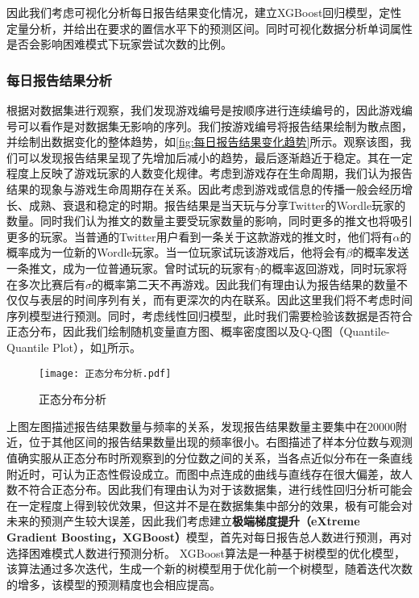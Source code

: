 \documentclass{MathModeling}
\begin{document}
	因此我们考虑可视化分析每日报告结果变化情况，建立XGBoost回归模型，定性定量分析，并给出在要求的置信水平下的预测区间。同时可视化数据分析单词属性是否会影响困难模式下玩家尝试次数的比例。
	\subsubsection{每日报告结果分析}\label{XGBoost}
	根据对数据集进行观察，我们发现游戏编号是按顺序进行连续编号的，因此游戏编号可以看作是对数据集无影响的序列。我们按游戏编号将报告结果绘制为散点图，并绘制出数据变化的整体趋势，如\textcolor{blue}{\cref{fig:每日报告结果变化趋势}}所示。观察该图，我们可以发现报告结果呈现了先增加后减小的趋势，最后逐渐趋近于稳定。其在一定程度上反映了游戏玩家的人数变化规律。考虑到游戏存在生命周期，我们认为报告结果的现象与游戏生命周期存在关系。因此考虑到游戏或信息的传播一般会经历增长、成熟、衰退和稳定的时期。报告结果是当天玩与分享Twitter的Wordle玩家的数量。同时我们认为推文的数量主要受玩家数量的影响，同时更多的推文也将吸引更多的玩家。当普通的Twitter用户看到一条关于这款游戏的推文时，他们将有$\alpha$的概率成为一位新的Wordle玩家。当一位玩家试玩该游戏后，他将会有$\beta$的概率发送一条推文，成为一位普通玩家。曾时试玩的玩家有$\gamma$的概率返回游戏，同时玩家将在多次比赛后有$\sigma$的概率第二天不再游戏。因此我们有理由认为报告结果的数量不仅仅与表层的时间序列有关，而有更深次的内在联系。因此这里我们将不考虑时间序列模型进行预测。同时，考虑线性回归模型，此时我们需要检验该数据是否符合正态分布，因此我们绘制随机变量直方图、概率密度图以及Q-Q图（Quantile-Quantile Plot），如\textcolor{blue}{\cref{fig:正态分布分析}}所示。
	\begin{figure}[H]
		\centering
		\texttt{[image: 正态分布分析.pdf]}
		\caption{正态分布分析}
		\label{fig:正态分布分析}
	\end{figure}
	
	上图左图描述报告结果数量与频率的关系，发现报告结果数量主要集中在$20000$附近，位于其他区间的报告结果数量出现的频率很小。右图描述了样本分位数与观测值确实服从正态分布时所观察到的分位数之间的关系，当各点近似分布在一条直线附近时，可认为正态性假设成立。而图中点连成的曲线与直线存在很大偏差，故人数不符合正态分布。因此我们有理由认为对于该数据集，进行线性回归分析可能会在一定程度上得到较优效果，但这并不是在数据集集中部分的效果，极有可能会对未来的预测产生较大误差，因此我们考虑建立\textbf{极端梯度提升（eXtreme Gradient Boosting，XGBoost）}模型，首先对每日报告总人数进行预测，再对选择困难模式人数进行预测分析。
	XGBoost算法是一种基于树模型的优化模型，该算法通过多次迭代，生成一个新的树模型用于优化前一个树模型，随着迭代次数的增多，该模型的预测精度也会相应提高\textcolor{blue}{\cite{pxgboost1}}。
\end{document}
